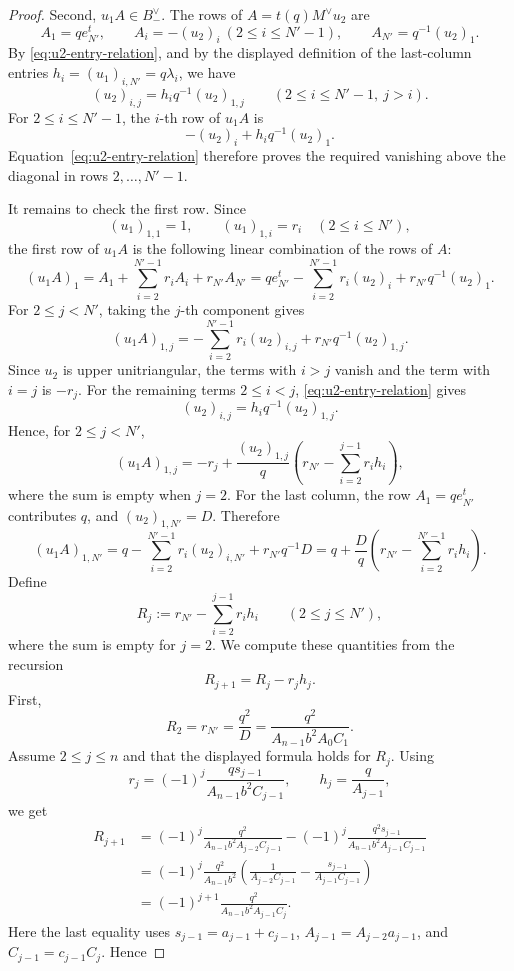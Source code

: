 \documentclass{article}
\begin{document}
\begin{proof}
Second, \(u_1A\in B_-^\vee\). The rows of \(A=t(q)M^\vee u_2\) are
\[
A_1=qe_{N'}^t,\qquad A_i=-(u_2)_i\ (2\le i\le N'-1),\qquad A_{N'}=q^{-1}(u_2)_1.
\]
By \eqref{eq:u2-entry-relation}, and by the displayed definition of the last-column entries \(h_i=(u_1)_{i,N'}=q\lambda_i\), we have
\[
(u_2)_{i,j}=h_iq^{-1}(u_2)_{1,j}
\qquad(2\le i\le N'-1,\ j>i).
\]
For \(2\le i\le N'-1\), the \(i\)-th row of \(u_1A\) is
\[
-(u_2)_i+h_iq^{-1}(u_2)_1.
\]
Equation~\eqref{eq:u2-entry-relation} therefore proves the required vanishing above the diagonal in rows \(2,\ldots,N'-1\).

It remains to check the first row. Since
\[
(u_1)_{1,1}=1,\qquad (u_1)_{1,i}=r_i\quad(2\le i\le N'),
\]
the first row of \(u_1A\) is the following linear combination of the rows of \(A\):
\[
(u_1A)_1
=
A_1+\sum_{i=2}^{N'-1}r_iA_i+r_{N'}A_{N'}
=
qe_{N'}^t-\sum_{i=2}^{N'-1}r_i(u_2)_i
+r_{N'}q^{-1}(u_2)_1.
\]
For \(2\le j<N'\), taking the \(j\)-th component gives
\[
(u_1A)_{1,j}
=
-\sum_{i=2}^{N'-1}r_i(u_2)_{i,j}
+r_{N'}q^{-1}(u_2)_{1,j}.
\]
Since \(u_2\) is upper unitriangular, the terms with \(i>j\) vanish and the term with \(i=j\) is \(-r_j\). For the remaining terms \(2\le i<j\), \eqref{eq:u2-entry-relation} gives
\[
(u_2)_{i,j}=h_iq^{-1}(u_2)_{1,j}.
\]
Hence, for \(2\le j<N'\),
\[
(u_1A)_{1,j}
=
-r_j+\frac{(u_2)_{1,j}}{q}
\left(
r_{N'}-\sum_{i=2}^{j-1}r_ih_i
\right),
\]
where the sum is empty when \(j=2\). For the last column, the row \(A_1=qe_{N'}^t\) contributes \(q\), and \((u_2)_{1,N'}=D\). Therefore
\[
(u_1A)_{1,N'}
=
q-\sum_{i=2}^{N'-1}r_i(u_2)_{i,N'}
+r_{N'}q^{-1}D
=
q+\frac{D}{q}
\left(
r_{N'}-\sum_{i=2}^{N'-1}r_ih_i
\right).
\]
Define
\[
R_j:=r_{N'}-\sum_{i=2}^{j-1}r_ih_i
\qquad(2\le j\le N'),
\]
where the sum is empty for \(j=2\). We compute these quantities from the recursion
\[
R_{j+1}=R_j-r_jh_j.
\]
First,
\[
R_2=r_{N'}=\frac{q^2}{D}
=\frac{q^2}{A_{n-1}b^2A_0C_1}.
\]
Assume \(2\le j\le n\) and that the displayed formula holds for \(R_j\). Using
\[
r_j=(-1)^j\frac{q s_{j-1}}{A_{n-1}b^2C_{j-1}},
\qquad
h_j=\frac{q}{A_{j-1}},
\]
we get
\[
\begin{aligned}
R_{j+1}
&=
(-1)^j\frac{q^2}{A_{n-1}b^2A_{j-2}C_{j-1}}
-
(-1)^j\frac{q^2s_{j-1}}{A_{n-1}b^2A_{j-1}C_{j-1}}\\
&=
(-1)^j\frac{q^2}{A_{n-1}b^2}
\left(
\frac{1}{A_{j-2}C_{j-1}}
-
\frac{s_{j-1}}{A_{j-1}C_{j-1}}
\right)\\
&=
(-1)^{j+1}
\frac{q^2}{A_{n-1}b^2A_{j-1}C_j}.
\end{aligned}
\]
Here the last equality uses \(s_{j-1}=a_{j-1}+c_{j-1}\), \(A_{j-1}=A_{j-2}a_{j-1}\), and \(C_{j-1}=c_{j-1}C_j\). Hence

\end{proof}
\end{document}
